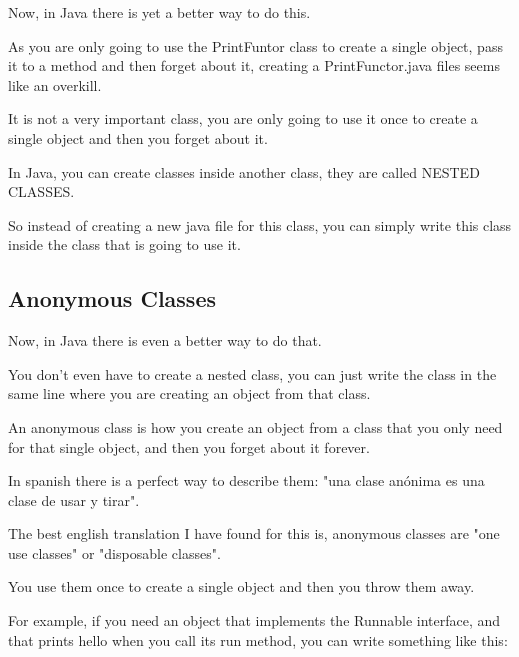 \documentclass[a4paper, 9pt]{extarticle}
\begin{document}
Now, in Java there is yet a better way to do this.

As you are only going to use the PrintFuntor class to create a single object,
pass it to a method and then forget about it, creating a PrintFunctor.java
files seems like an overkill.

It is not a very important class, you are only going to use it once to create a
single object and then you forget about it.

In Java, you can create classes inside another class, they are called NESTED
CLASSES.

So instead of creating a new java file for this class, you can simply write
this class inside the class that is going to use it.





\subsection{Anonymous Classes}

Now, in Java there is even a better way to do that.

You don't even have to create a nested class, you can just write the class in
the same line where you are creating an object from that class.

An anonymous class is how you create an object from a class that you only need
for that single object, and then you forget about it forever.

In spanish there is a perfect way to describe them: "una clase anónima es una
clase de usar y tirar".

The best english translation I have found for this is, anonymous classes are
"one use classes" or "disposable classes".

You use them once to create a single object and then you throw them away.

For example, if you need an object that implements the Runnable interface, and
that prints hello when you call its run method, you can write something like this:

\end{document}
